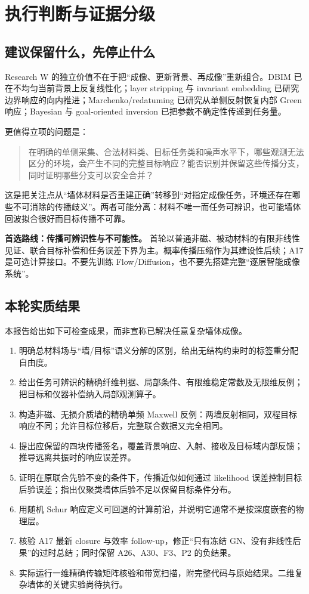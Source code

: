 \section{执行判断与证据分级}
\subsection{建议保留什么，先停止什么}
Research W 的独立价值不在于把“成像、更新背景、再成像”重新组合。DBIM 已在不均匀当前背景上反复线性化；layer stripping 与 invariant embedding 已研究边界响应的向内推进；Marchenko/redatuming 已研究从单侧反射恢复内部 Green 响应；Bayesian 与 goal-oriented inversion 已把参数不确定性传递到任务量。\cite{L_DBIM,L_Somersalo,L_EM2017,L_Marchenko22,L_Goal}

更值得立项的问题是：
\begin{quote}
在明确的单侧采集、合法材料类、目标任务类和噪声水平下，哪些观测无法区分的环境，会产生不同的完整目标响应？能否识别并保留这些传播分支，同时证明哪些分支可以安全合并？
\end{quote}

这是把关注点从“墙体材料是否重建正确”转移到“对指定成像任务，环境还存在哪些不可消除的传播歧义”。两者可能分离：材料不唯一而任务可辨识，也可能墙体回波拟合很好而目标传播不可靠。

\textbf{首选路线：传播可辨识性与不可能性。} 首轮以普通非磁、被动材料的有限非线性见证、联合目标补偿和任务误差下界为主。概率传播压缩作为其建设性后续；A17 是可选计算接口。不要先训练 Flow/Diffusion，也不要先搭建完整“逐层智能成像系统”。

\subsection{本轮实质结果}
本报告给出如下可检查成果，而非宣称已解决任意复杂墙体成像。
\begin{enumerate}
\item 明确总材料场与“墙/目标”语义分解的区别，给出无结构约束时的标签重分配自由度。
\item 给出任务可辨识的精确纤维判据、局部条件、有限维稳定常数及无限维反例；把目标和仪器补偿纳入局部观测算子。
\item 构造非磁、无损介质墙的精确单频 Maxwell 反例：两墙反射相同，双程目标响应不同；允许目标位移后，完整联合数据又完全相同。
\item 提出应保留的四块传播签名，覆盖背景响应、入射、接收及目标域内部反馈；推导远离共振时的响应误差界。
\item 证明在原联合先验不变的条件下，传播近似如何通过 likelihood 误差控制目标后验误差；指出仅聚类墙体后验不足以保留目标条件分布。
\item 用随机 Schur 响应定义可回退的计算前沿，并说明它通常不是按深度嵌套的物理层。
\item 核验 A17 最新 closure 与效率 follow-up，修正“只有冻结 GN、没有非线性后果”的过时总结；同时保留 A26、A30、F3、P2 的负结果。
\item 实际运行一维精确传输矩阵核验和带宽扫描，附完整代码与原始结果。二维复杂墙体的关键实验尚待执行。
\end{enumerate}

